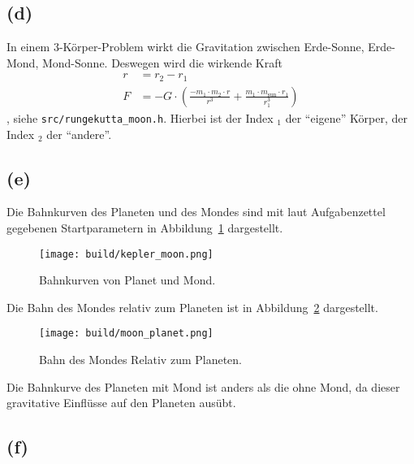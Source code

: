 \documentclass{scrartcl}
\begin{document}
\subsection*{(d)}
In einem 3-Körper-Problem wirkt die Gravitation zwischen Erde-Sonne, Erde-Mond, Mond-Sonne.
Deswegen wird die wirkende Kraft
\begin{align}
  r &= r_2 - r_1 \\
  F &= - G \cdot \left(\frac{- m_1 \cdot m_2 \cdot r}{r^3} + \frac{m_1 \cdot m_{\text{sun}} \cdot
    r_1}{r_1^3}\right)
\end{align}
, siehe \texttt{src/rungekutta_moon.h}.
Hierbei ist der Index ${}_1$ der \enquote{eigene} Körper,
der Index ${}_2$ der \enquote{andere}.
\subsection*{(e)}
Die Bahnkurven des Planeten und des Mondes sind mit laut Aufgabenzettel gegebenen Startparametern
in Abbildung~\ref{fig:kepler_moon} dargestellt.
\begin{figure}[ht]
  \centering
  \texttt{[image: build/kepler\_moon.png]}
  \caption{Bahnkurven von Planet und Mond.}%
  \label{fig:kepler_moon}
\end{figure}

Die Bahn des Mondes relativ zum Planeten ist in Abbildung~\ref{fig:moon_planet} dargestellt.
\begin{figure}[ht]
  \centering
  \texttt{[image: build/moon\_planet.png]}
  \caption{Bahn des Mondes Relativ zum Planeten.}%
  \label{fig:moon_planet}
\end{figure}

Die Bahnkurve des Planeten mit Mond ist anders als die ohne Mond, da dieser gravitative Einflüsse auf den
Planeten ausübt.
\subsection*{(f)}
\end{document}
